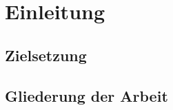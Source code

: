 \chapter{Einleitung}
\label{ch:einleitung}

\section{Zielsetzung}
\label{sec:motivation}

\section{Gliederung der Arbeit}
\label{sec:gliederung}
